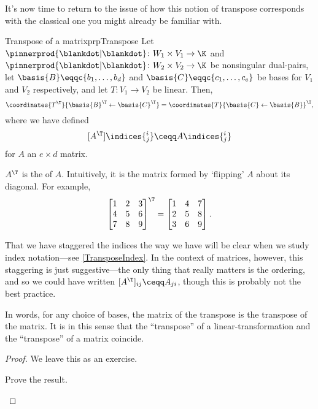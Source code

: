 It's now time to return to the issue of how this notion of transpose corresponds with the classical one you might already be familiar with. 
\begin{prp}{Transpose of a matrix}{prpTranspose}
	Let $\pinnerprod{\blankdot |\blankdot}\colon W_1\times V_1\rightarrow \K$ and $\pinnerprod{\blankdot |\blankdot}\colon W_2\times V_2\rightarrow \K$ be nonsingular dual-pairs, let $\basis{B}\eqqc \{ b_1,\ldots ,b_d\}$ and $\basis{C}\eqqc \{ c_1,\ldots ,c_e\}$ be bases for $V_1$ and $V_2$ respectively, and let $T\colon V_1\rightarrow V_2$ be linear.  Then,
	\begin{equation}
		\coordinates{T^{\T}}{\basis{B}^{\T}\leftarrow \basis{C}^{\T}}=\coordinates{T}{\basis{C}\leftarrow \basis{B}}^{\T},
	\end{equation}
	where we have defined
	\begin{equation}\label{eqn5.2.72}
		[A^{\T}]\indices{^i_j}\ceqq A\indices{_j^i}
	\end{equation}
	for $A$ an $e\times d$ matrix.
	\begin{rmk}
		$A^{\T}$ is the  of $A$.  Intuitively, it is the matrix formed by `flipping' $A$ about its diagonal.  For example,
		\begin{equation}
		\begin{bmatrix}1 & 2 & 3 \\ 4 & 5 & 6 \\ 7 & 8 & 9\end{bmatrix}^{\T}=\begin{bmatrix}1 & 4 & 7 \\ 2 & 5 & 8 \\ 3 & 6 & 9\end{bmatrix}.
		\end{equation}
		
		That we have staggered the indices the way we have will be clear when we study index notation---see \cref{TransposeIndex}.  In the context of matrices, however, this staggering is just suggestive---the only thing that really matters is the ordering, and so we could have written $[A^{\T}]_{ij}\ceqq A_{ji}$, though this is probably not the best practice.
	\end{rmk}
	\begin{rmk}
		In words, for any choice of bases, the matrix of the transpose is the transpose of the matrix.  It is in this sense that the ``transpose'' of a linear-transformation and the ``transpose'' of a matrix coincide.
	\end{rmk}
	\begin{proof}
		We leave this as an exercise.
		\begin{exr}[breakable=false]{}{}
			Prove the result.
		\end{exr}
	\end{proof}
\end{prp}

